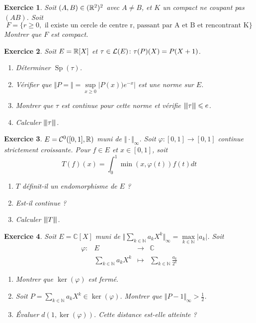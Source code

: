 \documentclass[12pt]{article}
\newtheorem{exercise}{Exercice}[section]
\theoremstyle{remark}
\theoremstyle{remark}
\newcommand{\C}{\mathbb{C}} \newcommand{\Q}{\mathbb{Q}}
\newcommand{\N}{\mathbb{N}} \newcommand{\Z}{\mathbb{Z}}
\DeclareMathOperator{\Sp}{Sp} \DeclareMathOperator{\mat}{mat}
\newcommand{\vertiii}[1]{{\left\vert\kern-0.25ex\left\vert\kern-0.25ex\left\vert{}#1
\right\vert\kern-0.25ex\right\vert\kern-0.25ex\right\vert}}
\newcommand{\function}[5]{
	$$
	\begin{array}{rccl}
		#1: & #2 & \to & #3 \\
		& #4 & \mapsto & #5
	\end{array}
	$$
}
\begin{document}
\begin{exercise}
	Soit $(A,B)\in(\mathbb{R}^{2})^{2}$ avec $A\neq B$, et $K$ un compact ne coupant pas $(AB)$. Soit 
	$$F=\{r\geqslant0,\text{ il existe un cercle de centre r, passant par A et B et rencontrant K}\}$$
	Montrer que $F$ est compact.
\end{exercise}

\begin{exercise}
	Soit $E=\mathbb{R}[X]$ et $\tau\in\mathcal{L}(E)\colon\tau(P)(X)=P(X+1)$.
	\begin{enumerate}
		\item Déterminer $\Sp(\tau)$.
		\item Vérifier que $\Vert P=\Vert=\sup\limits_{x\geqslant0}\vert P(x))e^{-x}\vert$ est une norme sur $E$.
		\item Montrer que $\tau$ est continue pour cette norme et vérifie $\vertiii{\tau}\leqslant e$.
		\item Calculer $\vertiii{\tau}$.
	\end{enumerate}
\end{exercise}

\begin{exercise}
	$E=\mathcal{C}^{0}([0,1],\mathbb{R})$ muni de $\Vert\cdot\Vert_{\infty}$. Soit $\varphi\colon[0,1]\to[0,1]$ continue strictement croissante. Pour $f\in E$ et $x\in[0,1]$, soit 
	$$T(f)(x)=\int_{0}^{1}\min(x,\varphi(t))f(t)dt$$
	\begin{enumerate}
		\item $T$ définit-il un endomorphisme de $E$ ?
		\item Est-il continue ?
		\item Calculer $\vertiii{T}$.
	\end{enumerate}
\end{exercise}

\begin{exercise}
	Soit $E=\C[X]$ muni de $\Vert\sum_{k\in\N} a_{k}X^{k}\Vert_{\infty}=\max\limits_{k\in\N}\vert a_{k}\vert$. Soit \function{\varphi}{E}{\C}{\sum_{k\in\N}a_{k}X^{k}}{\sum_{k\in\N}\frac{a_k}{2^{k}}}
	\phantom{}
	\begin{enumerate}
		\item Montrer que $\ker(\varphi)$ est fermé.
		\item Soit $P=\sum_{k\in\N}a_{k}X^{k}\in\ker(\varphi)$. Montrer que $\Vert P-1\Vert_{\infty}>\frac{1}{2}$.
		\item Évaluer $d(1,\ker(\varphi))$. Cette distance est-elle atteinte ?
	\end{enumerate}
\end{exercise}
\end{document}

